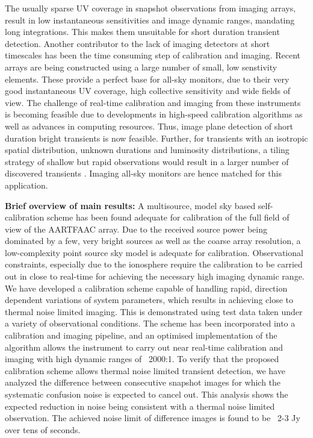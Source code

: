 \documentclass{aa}
\begin{document}
The usually  sparse UV  coverage in snapshot  observations from  imaging arrays,
result in  low instantaneous sensitivities  and image dynamic  ranges, mandating
long  integrations. This  makes  them unsuitable  for  short duration  transient
detection.   Another contributor  to  the  lack of  imaging  detectors at  short
timescales has been  the time consuming step of  calibration and imaging. Recent
arrays  are being  constructed using  a large  number of  small,  low senstivity
elements. These provide  a perfect base for all-sky monitors,  due to their very
good instantaneous UV  coverage, high collective sensitivity and  wide fields of
view.  The challenge of real-time calibration and imaging from these instruments
is becoming feasible due to developments in high-speed calibration algorithms as
well as  advances in computing resources.  Thus, image plane  detection of short
duration  bright transients  is now  feasible. Further,  for transients  with an
isotropic spatial distribution,  unknown durations and luminosity distributions,
a tiling  strategy of shallow  but rapid observations  would result in  a larger
number  of  discovered transients  \citep  {nemiroff2003tile}.  Imaging  all-sky
monitors are hence matched for this application.


\textbf{Brief  overview  of  main  results:}  A  multisource,  model  sky  based
self-calibration  scheme has  been found  adequate for  calibration of  the full
field of  view of the  AARTFAAC array.  Due  to the received source  power being
dominated by a few, very bright  sources as well as the coarse array resolution,
a  low-complexity   point  source  sky   model  is  adequate   for  calibration.
Observational  constraints,  especially  due   to  the  ionosphere  require  the
calibration to be carried out in  close to real-time for achieving the necessary
high imaging dynamic  range.  We have developed a  calibration scheme capable of
handling  rapid,  direction dependent  variations  of  system parameters,  which
results in achieving close to thermal noise limited imaging. This is demonstrated
using test data  taken under a variety of  observational conditions.  The scheme
has been incorporated into a  calibration and imaging pipeline, and an optimised
implementation  of  the  algorithm  allows  the instrument  to  carry  out  near
real-time  calibration and  imaging with  high  dynamic ranges  of ~2000:1.   To
verify  that  the  proposed  calibration  scheme allows  thermal  noise  limited
transient  detection,  we  have  analyzed  the  difference  between  consecutive
snapshot images for  which the systematic confusion noise  is expected to cancel
out. This analysis shows the expected reduction in noise being consistent with a
thermal noise limited observation. The achieved noise limit of difference images
is found  to be ~2-3 Jy  over tens of  seconds.
 
\end{document}
